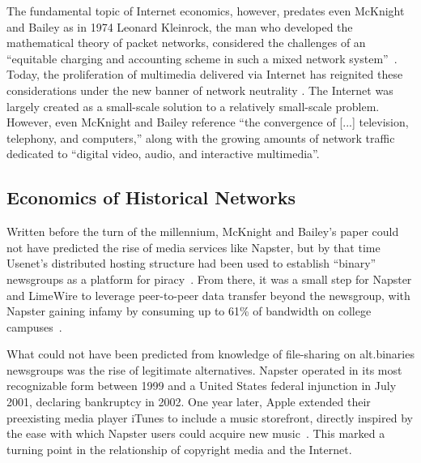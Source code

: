 \documentclass[journal]{IEEEtran}
\begin{document}
The fundamental topic of Internet economics, however, predates even McKnight and Bailey as in 1974 Leonard Kleinrock, the man who developed the mathematical theory of packet networks, considered the challenges of an \enquote{equitable charging and accounting scheme in such a mixed network system}~\cite{kleinrock74}. Today, the proliferation of multimedia delivered via Internet has reignited these considerations under the new banner of network neutrality \cite{faulhaber11}. The Internet was largely created as a small-scale solution to a relatively small-scale problem. However, even McKnight and Bailey reference \enquote{the convergence of [...] television, telephony, and computers,} along with the growing amounts of network traffic dedicated to \enquote{digital video, audio, and interactive multimedia}.

\subsection{Economics of Historical Networks}

Written before the turn of the millennium, McKnight and Bailey's paper could not have predicted the rise of media services like Napster, but by that time Usenet's distributed hosting structure had been used to establish \enquote{binary} newsgroups as a platform for piracy~\cite{seganusenet}. From there, it was a small step for Napster and LimeWire to leverage peer-to-peer data transfer beyond the newsgroup, with Napster gaining infamy by consuming up to 61\% of bandwidth on college campuses~\cite{napsterbandwidth}.

What could not have been predicted from knowledge of file-sharing on alt.binaries newsgroups was the rise of legitimate alternatives. Napster operated in its most recognizable form between 1999 and a United States federal injunction in July 2001, declaring bankruptcy in 2002. One year later, Apple extended their preexisting media player iTunes to include a music storefront, directly inspired by the ease with which Napster users could acquire new music~\cite{jobsandnapster}. This marked a turning point in the relationship of copyright media and the Internet.

\end{document}
